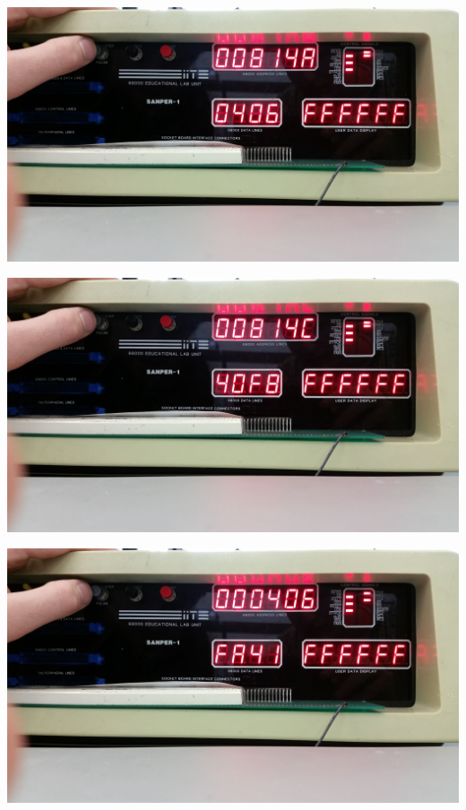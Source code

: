 \documentclass[12pt, twocolumn]{article}
\begin{document}
\begin{center}
\includegraphics[width=1\linewidth]{Lab1/20150120_095011}
\end{center}
\begin{center}
\includegraphics[width=1\linewidth]{Lab1/20150120_095012}
\end{center}
\begin{center}
\includegraphics[width=1\linewidth]{Lab1/20150120_095014}
\end{center}
\end{document}
